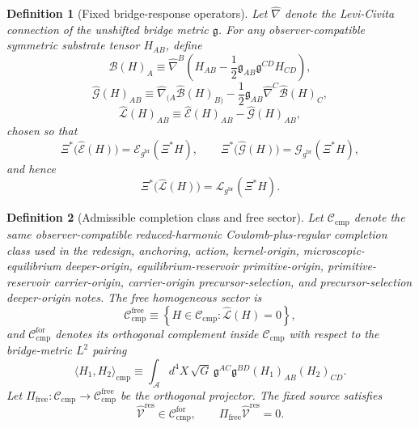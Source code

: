\documentclass[11pt]{article}
\newcommand{\Sub}{\mathcal A}
\newcommand{\ObserverMap}{\Xi}
\newcommand{\BridgeMetric}{\mathfrak g}
\newcommand{\ObserverMetric}{g^{\mathrm{br}}}
\newcommand{\ResidualLift}{\widehat{\mathcal V}^{\mathrm{res}}}
\newcommand{\SubEinLin}{\widehat{\mathcal E}}
\newcommand{\SubGaugeVec}{\widehat{\mathcal B}}
\newcommand{\SubGaugeBook}{\widehat{\mathcal G}}
\newcommand{\SubReducedEin}{\widehat{\mathcal L}}
\newcommand{\FreeProj}{\Pi_{\mathrm{free}}}
\newcommand{\ReducedEin}{\mathcal L_{\ObserverMetric}}
\newcommand{\GaugeBook}{\mathcal G_{\ObserverMetric}}
\newcommand{\EinLin}{\mathcal E_{\ObserverMetric}}
\newcommand{\CompClass}{\mathscr C_{\mathrm{cmp}}}
\newcommand{\CompFree}{\mathscr C_{\mathrm{cmp}}^{\mathrm{free}}}
\newcommand{\CompForced}{\mathscr C_{\mathrm{cmp}}^{\mathrm{for}}}
\newtheorem{definition}{Definition}
\begin{document}
\begin{definition}[Fixed bridge-response operators]
\label{def:operators}
Let \(\widehat\nabla\) denote the Levi-Civita connection of the unshifted bridge metric \(\BridgeMetric\). For any observer-compatible symmetric substrate tensor \(H_{AB}\), define
\begin{equation}
\SubGaugeVec(H)_A
\equiv
\widehat\nabla^B\!\left(
H_{AB}
-\frac12 \BridgeMetric_{AB}\BridgeMetric^{CD}H_{CD}
\right),
\label{eq:subB}
\end{equation}
\begin{equation}
\SubGaugeBook(H)_{AB}
\equiv
\widehat\nabla_{(A}\SubGaugeVec(H)_{B)}
-\frac12 \BridgeMetric_{AB}\widehat\nabla^C\SubGaugeVec(H)_C,
\label{eq:subG}
\end{equation}
\begin{equation}
\SubReducedEin(H)_{AB}
\equiv
\SubEinLin(H)_{AB}-\SubGaugeBook(H)_{AB},
\label{eq:subL}
\end{equation}
chosen so that
\begin{equation}
\ObserverMap^*\bigl(\SubEinLin(H)\bigr)=\EinLin(\ObserverMap^*H),
\qquad
\ObserverMap^*\bigl(\SubGaugeBook(H)\bigr)=\GaugeBook(\ObserverMap^*H),
\label{eq:intertwine1}
\end{equation}
and hence
\begin{equation}
\ObserverMap^*\bigl(\SubReducedEin(H)\bigr)
=
\ReducedEin(\ObserverMap^*H).
\label{eq:intertwine2}
\end{equation}
\end{definition}

\begin{definition}[Admissible completion class and free sector]
\label{def:class}
Let \(\CompClass\) denote the same observer-compatible reduced-harmonic Coulomb-plus-regular completion class used in the redesign, anchoring, action, kernel-origin, microscopic-equilibrium deeper-origin, equilibrium-reservoir primitive-origin, primitive-reservoir carrier-origin, carrier-origin precursor-selection, and precursor-selection deeper-origin notes. The free homogeneous sector is
\begin{equation}
\CompFree
\equiv
\left\{
H\in\CompClass:\SubReducedEin(H)=0
\right\},
\label{eq:freeclass}
\end{equation}
and \(\CompForced\) denotes its orthogonal complement inside \(\CompClass\) with respect to the bridge-metric \(L^2\) pairing
\begin{equation}
\langle H_1,H_2\rangle_{\mathrm{cmp}}
\equiv
\int_{\Sub} d^4X\,\sqrt{G}\,
\BridgeMetric^{AC}\BridgeMetric^{BD}(H_1)_{AB}(H_2)_{CD}.
\label{eq:inner}
\end{equation}
Let \(\FreeProj:\CompClass\to\CompFree\) be the orthogonal projector. The fixed source satisfies
\begin{equation}
\ResidualLift\in\CompForced,
\qquad
\FreeProj\ResidualLift=0.
\label{eq:sourcefree}
\end{equation}
\end{definition}
\end{document}
